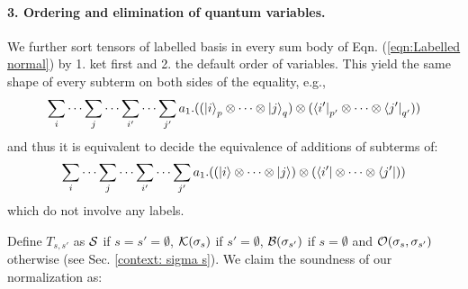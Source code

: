 \paragraph*{3. Ordering and elimination of quantum variables.} 
We further sort tensors of labelled basis in every sum body of Eqn. (\ref{eqn:Labelled normal}) by 1. ket first and 2. the default order of variables. This yield the same shape of every subterm on both sides of the equality, e.g., 
\begin{equation*}
  \sum_{i}\cdots\sum_{j}\cdots \sum_{i'}\cdots\sum_{j'} a_1 . ((\ket{i}_p \otimes \cdots \otimes \ket{j}_q) \otimes (\bra{i'}_{p'}\otimes\cdots\otimes \bra{j'}_{q'}))
\end{equation*}
and thus it is equivalent to decide the equivalence of additions of subterms of:
\begin{equation*}
  \sum_{i}\cdots\sum_{j}\cdots \sum_{i'}\cdots\sum_{j'} a_1 . ((\ket{i} \otimes \cdots \otimes \ket{j}) \otimes (\bra{i'}\otimes\cdots\otimes \bra{j'}))
\end{equation*}
which do not involve any labels. 

Define $T_{s,s'}$ as $\mathcal{S}$ if $s=s'=\emptyset$, $\mathcal{K}(\sigma_s)$ if $s'=\emptyset$, $\mathcal{B}(\sigma_{s'})$ if $s=\emptyset$ and $\mathcal{O}(\sigma_s,\sigma_{s'})$ otherwise (see Sec. \ref{context: sigma s}). We claim the soundness of our normalization as:

